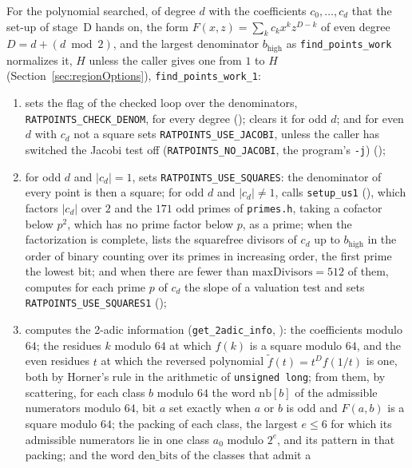 For the polynomial searched, of degree $d$ with the coefficients $c_0, \dots, c_d$ that the
set-up of stage~D hands on, the form $F(x, z) = \sum_k c_k x^k z^{D - k}$ of even degree
$D = d + (d \bmod 2)$, and the largest denominator $b_{\mathrm{high}}$ as \verb|find_points_work|
normalizes it, $H$ unless the caller gives one from $1$ to $H$ (Section~\ref{sec:regionOptions}),
\verb|find_points_work_1|:
\begin{enumerate}
  \item sets the flag of the checked loop over the denominators, \verb|RATPOINTS_CHECK_DENOM|, for
    every degree (); clears it for odd $d$; and for even $d$ with
    $c_d$ not a square sets \verb|RATPOINTS_USE_JACOBI|, unless the caller has switched the Jacobi
    test off (\verb|RATPOINTS_NO_JACOBI|, the program's \verb|-j|)
    ();
  \item for odd $d$ and $|c_d| = 1$, sets \verb|RATPOINTS_USE_SQUARES|: the denominator of every
    point is then a square; for odd $d$ and $|c_d| \ne 1$, calls \verb|setup_us1|
    (), which factors $|c_d|$ over $2$ and the $171$ odd primes of
    \verb|primes.h|, taking a cofactor below $p^2$, which has no prime factor below $p$, as a prime;
    when the factorization is complete, lists the squarefree divisors of $c_d$ up to
    $b_{\mathrm{high}}$ in the order of binary counting over its primes in increasing order, the
    first prime the lowest bit; and when there are fewer than $\mathrm{maxDivisors} = 512$ of them,
    computes for each prime $p$ of $c_d$ the slope of a valuation test and sets
    \verb|RATPOINTS_USE_SQUARES1| ();
  \item computes the 2-adic information (\verb|get_2adic_info|, ):
    the coefficients modulo $64$; the residues $k$ modulo $64$ at which $f(k)$ is a square modulo
    $64$, and the even residues $t$ at which the reversed polynomial
    $\tilde f(t) = t^D f(1/t)$ is one, both by Horner's rule in the arithmetic of
    \verb|unsigned long|; from them, by scattering, for each class $b$ modulo $64$ the word
    $\mathrm{nb}[b]$ of the admissible numerators modulo $64$, bit $a$ set exactly when $a$ or $b$
    is odd and $F(a, b)$ is a square modulo $64$; the packing of each class, the largest
    $e \le 6$ for which its admissible numerators lie in one class $a_0$ modulo $2^e$, and its
    pattern in that packing; and the word $\mathrm{den\_bits}$ of the classes that admit a

\end{enumerate}
